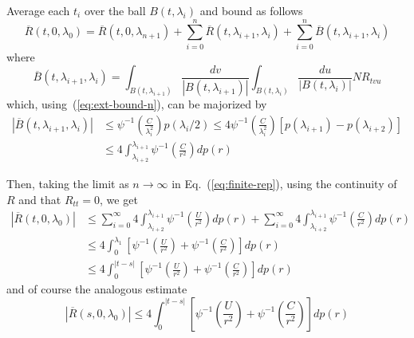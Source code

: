 \documentclass[a4paper,12pt,reqno]{amsproc}
\newcommand{\NN}{N}
\begin{document}
Average each $t_i$ over the ball $B(t,\lambda_i)$ and bound
as follows
\begin{equation}
\label{eq:finite-rep}
\overline R(t,0,\lambda_0) = \overline R(t,0,\lambda_{n+1}) 
+ \sum_{i=0}^{n} \overline R(t,\lambda_{i+1},\lambda_{i}) +
\sum_{i=0}^{n} \overline B(t,\lambda_{i+1},\lambda_{i}) 
\end{equation}
where
\begin{equation*}
\overline B(t,\lambda_{i+1},\lambda_i) = \int_{B(t,\lambda_{i+1})}
\frac{dv}{| B(t,\lambda_{i+1}) |}  \int_{B(t,\lambda_i)}
\frac{du}{| B(t,\lambda_i)|} \NN
R_{tvu}   
\end{equation*}
which, using~(\ref{eq:ext-bound-n}), can be majorized by
\begin{equation*}
  \begin{split}
 | \overline B(t,\lambda_{i+1},\lambda_i)| & \le \psi^{-1}\left(
 \frac{C}{  \lambda_i^2}\right) p( \lambda_i/2) \le  4 \psi^{-1}\left(
 \frac{C}{ \lambda_i^2}\right) [p(\lambda_{i+1})-p(\lambda_{i+2})]
\\ & \le  4 \int_{\lambda_{i+2}}^{\lambda_{i+1}} \psi^{-1}\left(
 \frac{C}{ r^2}\right) dp(r)    
  \end{split}
\end{equation*}

Then, taking the limit as $n \to \infty$ in Eq.~(\ref{eq:finite-rep}), using the continuity of
$R$ and that $R_{tt}=0$, we get
\begin{equation}
\label{eq:bound-from-t}
  \begin{split}
|\overline R(t,0,\lambda_0)| & \le 
 \sum_{i=0}^{\infty} 4 \int_{\lambda_{i+2}}^{\lambda_{i+1}} 
 \psi^{-1}\left(\frac{U}{ r^2}\right)   dp(r) 
+ \sum_{i=0}^{\infty} 4 \int_{\lambda_{i+2}}^{\lambda_{i+1}} \psi^{-1}\left(
 \frac{C}{ r^2}\right) dp(r)    
\\ &    \le 4 \int_0^{\lambda_1} \left[ \psi^{-1}\left(\frac{U}{ r^2}\right)+ \psi^{-1}\left(\frac{C}{ r^2}\right)\right]   dp(r) 
\\ &    \le 4 \int_0^{|t-s|} \left[ \psi^{-1}\left(\frac{U}{ r^2}\right)+ \psi^{-1}\left(\frac{C}{ r^2}\right)\right]   dp(r) 
  \end{split}
\end{equation}
and of course the analogous estimate
\begin{equation}
\label{eq:bound-from-s}
  |\overline R(s,0,\lambda_0)|  \le  4 \int_0^{|t-s|} \left[ \psi^{-1}\left(\frac{U}{ r^2}\right)+ \psi^{-1}\left(\frac{C}{ r^2}\right)\right]   dp(r) 
\end{equation}
\end{document}
